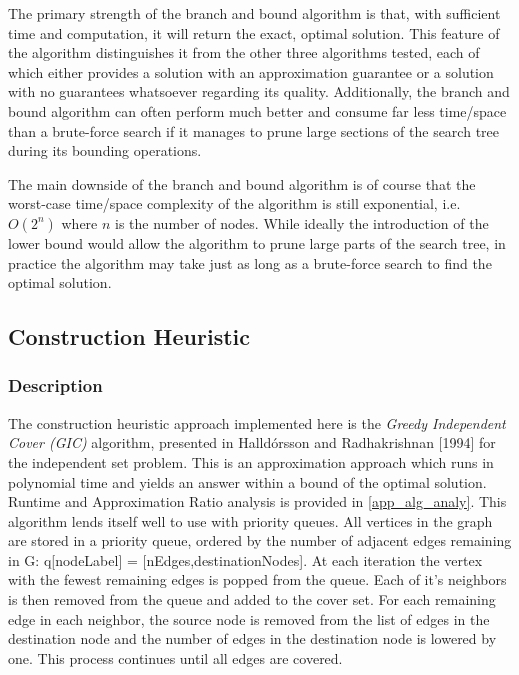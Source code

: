 \documentclass[acmlarge]{acmart}
\begin{document}

The primary strength of the branch and bound algorithm is that, with sufficient time and computation, it will return the exact, optimal solution. This feature of the algorithm distinguishes it from the other three algorithms tested, each of which either provides a solution with an approximation guarantee or a solution with no guarantees whatsoever regarding its quality. Additionally, the branch and bound algorithm can often perform much better and consume far less time/space than a brute-force search if it manages to prune large sections of the search tree during its bounding operations.

The main downside of the branch and bound algorithm is of course that the worst-case time/space complexity of the algorithm is still exponential, i.e. $O(2^n)$ where $n$ is the number of nodes. While ideally the introduction of the lower bound would allow the algorithm to prune large parts of the search tree, in practice the algorithm may take just as long as a brute-force search to find the optimal solution.

\subsection{Construction Heuristic}

\subsubsection{Description}

The construction heuristic approach implemented here is the \textit{Greedy Independent Cover (GIC)} algorithm, presented in Halld\'{o}rsson and Radhakrishnan [1994] \cite{Hall97} for the independent set problem. This is an approximation approach which runs in polynomial time and yields an answer within a bound of the optimal solution. Runtime and Approximation Ratio analysis is provided in \ref{app_alg_analy}. This algorithm lends itself well to use with priority queues. All vertices in the graph are stored in a priority queue, ordered by the number of adjacent edges remaining in G: q[nodeLabel] = [nEdges,destinationNodes]. At each iteration the vertex with the fewest remaining edges is popped from the queue. Each of it's neighbors is then removed from the queue and added to the cover set. For each remaining edge in each neighbor, the source node is removed from the list of edges in the destination node and the number of edges in the destination node is lowered by one. This process continues until all edges are covered.
\end{document}
